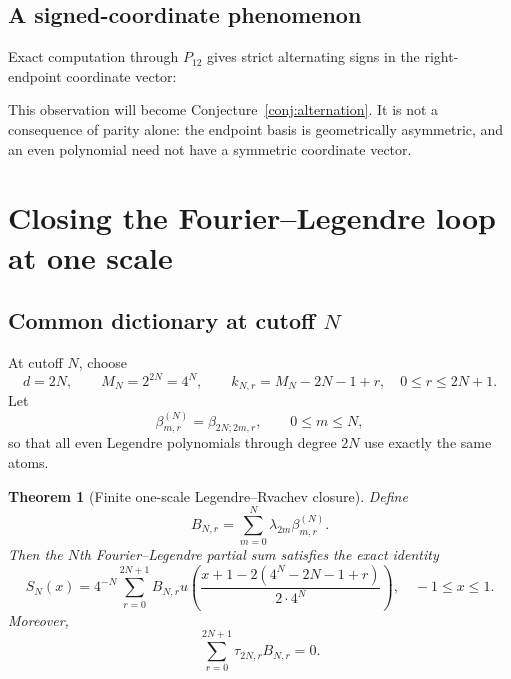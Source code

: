 \documentclass[11pt,oneside]{article}
\newtheorem{theorem}{Theorem}[section]
\theoremstyle{definition}
\theoremstyle{remark}
\begin{document}
\subsection{A signed-coordinate phenomenon}
Exact computation through $P_{12}$ gives strict alternating signs in the
right-endpoint coordinate vector:
\begin{center}

\end{center}
This observation will become Conjecture~\ref{conj:alternation}.  It is not a
consequence of parity alone: the endpoint basis is geometrically asymmetric,
and an even polynomial need not have a symmetric coordinate vector.

\section{Closing the Fourier--Legendre loop at one scale}
\label{sec:closed-loop}

\subsection{Common dictionary at cutoff $N$}
At cutoff $N$, choose
\begin{equation}
 d=2N,
 \qquad M_N=2^{2N}=4^N,
 \qquad k_{N,r}=M_N-2N-1+r,
 \quad0\le r\le2N+1.
 \label{eq:cutoff-dictionary}
\end{equation}
Let
\begin{equation}
 \beta^{(N)}_{m,r}=\beta_{2N;2m,r},
 \qquad0\le m\le N,
 \label{eq:betaN}
\end{equation}
so that all even Legendre polynomials through degree $2N$ use exactly the
same atoms.

\begin{theorem}[Finite one-scale Legendre--Rvachev closure]
\label{thm:finite-loop}
Define
\begin{equation}
 \boxed{B_{N,r}=\sum_{m=0}^{N}\lambda_{2m}\beta^{(N)}_{m,r}.}
 \label{eq:BN}
\end{equation}
Then the $N$th Fourier--Legendre partial sum satisfies the exact identity
\begin{equation}
 \boxed{
 S_N(x)=4^{-N}\sum_{r=0}^{2N+1}B_{N,r}
 u\!\left(
 \frac{x+1-2(4^N-2N-1+r)}{2\cdot4^N}
 \right),
 \quad -1\le x\le1.}
 \label{eq:SN-one-scale}
\end{equation}
Moreover,
\begin{equation}
 \sum_{r=0}^{2N+1}\tau_{2N,r}B_{N,r}=0.
 \label{eq:BN-certificate}
\end{equation}
\end{theorem}
\end{document}
